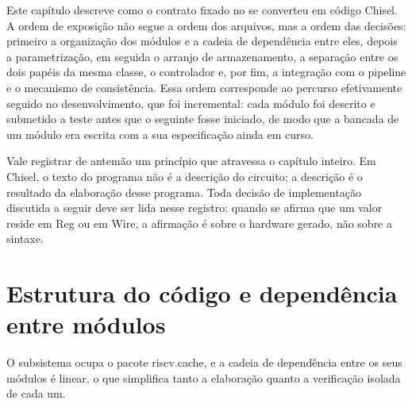 Este capítulo descreve como o contrato fixado no  se converteu em código Chisel. A ordem de exposição não segue a ordem dos arquivos, mas a ordem das decisões: primeiro a organização dos módulos e a cadeia de dependência entre eles, depois a parametrização, em seguida o arranjo de armazenamento, a separação entre os dois papéis da mesma classe, o controlador e, por fim, a integração com o pipeline e o mecanismo de consistência. Essa ordem corresponde ao percurso efetivamente seguido no desenvolvimento, que foi incremental: cada módulo foi descrito e submetido a teste antes que o seguinte fosse iniciado, de modo que a bancada de um módulo era escrita com a sua especificação ainda em curso.

Vale registrar de antemão um princípio que atravessa o capítulo inteiro. Em Chisel, o texto do programa não é a descrição do circuito; a descrição é o resultado da elaboração desse programa. Toda decisão de implementação discutida a seguir deve ser lida nesse registro: quando se afirma que um valor reside em Reg ou em Wire, a afirmação é sobre o hardware gerado, não sobre a sintaxe.

\section{Estrutura do código e dependência entre módulos}\label{sec:5.1}

O subsistema ocupa o pacote riscv.cache, e a cadeia de dependência entre os seus módulos é linear, o que simplifica tanto a elaboração quanto a verificação isolada de cada um.

